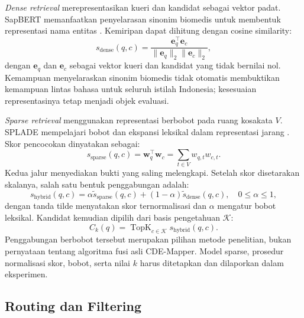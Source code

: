 \textit{Dense retrieval} merepresentasikan kueri dan kandidat sebagai vektor padat. SapBERT memanfaatkan penyelarasan sinonim biomedis untuk membentuk representasi nama entitas \citep{liu_self-alignment_2021}. Kemiripan dapat dihitung dengan cosine similarity:
\begin{equation}
 s_{\mathrm{dense}}(q,c)=\frac{\mathbf{e}_{q}^{\top}\mathbf{e}_{c}}{\lVert\mathbf{e}_{q}\rVert_2\lVert\mathbf{e}_{c}\rVert_2},
 \label{eq:dense-retrieval}
\end{equation}
 dengan $\mathbf{e}_{q}$ dan $\mathbf{e}_{c}$ sebagai vektor kueri dan kandidat yang tidak bernilai nol. Kemampuan menyelaraskan sinonim biomedis tidak otomatis membuktikan kemampuan lintas bahasa untuk seluruh istilah Indonesia; kesesuaian representasinya tetap menjadi objek evaluasi.

\textit{Sparse retrieval} menggunakan representasi berbobot pada ruang kosakata $V$. SPLADE mempelajari bobot dan ekspansi leksikal dalam representasi jarang \citep{formal_splade_2021}. Skor pencocokan dinyatakan sebagai:
\begin{equation}
 s_{\mathrm{sparse}}(q,c)=\mathbf{w}_{q}^{\top}\mathbf{w}_{c}=\sum_{t\in V}w_{q,t}w_{c,t}.
 \label{eq:sparse-retrieval}
\end{equation}
 Kedua jalur menyediakan bukti yang saling melengkapi. Setelah skor disetarakan skalanya, salah satu bentuk penggabungan adalah:
\begin{equation}
 s_{\mathrm{hybrid}}(q,c)=\alpha\widetilde{s}_{\mathrm{sparse}}(q,c)+(1-\alpha)\widetilde{s}_{\mathrm{dense}}(q,c),\quad 0\leq\alpha\leq1,
 \label{eq:hybrid-retrieval}
\end{equation}
 dengan tanda tilde menyatakan skor ternormalisasi dan $\alpha$ mengatur bobot leksikal. Kandidat kemudian dipilih dari basis pengetahuan $\mathcal{K}$:
\begin{equation}
 C_k(q)=\operatorname{TopK}_{c\in\mathcal{K}}s_{\mathrm{hybrid}}(q,c).
 \label{eq:topk-candidate-set}
\end{equation}
 Penggabungan berbobot tersebut merupakan pilihan metode penelitian, bukan pernyataan tentang algoritma fusi asli CDE-Mapper. Model sparse, prosedur normalisasi skor, bobot, serta nilai $k$ harus ditetapkan dan dilaporkan dalam eksperimen.

\subsection{Routing dan Filtering}

